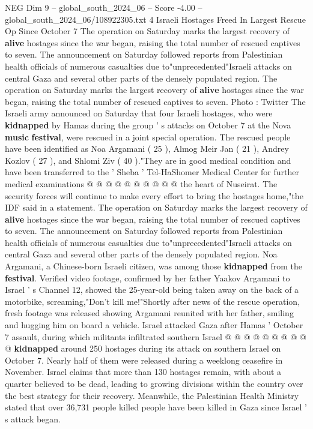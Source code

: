 \begin{textsample}{NEG Dim 9 – global\_south\_2024\_06 – Score -4.00 – global\_south\_2024\_06/108922305.txt}  \label{ex:f9_neg_359}
4 Israeli Hostages Freed In Largest Rescue Op Since October 7 The operation on Saturday marks the largest recovery of \textbf{alive} hostages since the war began, raising the total number of rescued captives to seven.
The announcement on Saturday followed reports from Palestinian health officials of numerous casualties due to"unprecedented"Israeli attacks on central Gaza and several other parts of the densely populated region.
The operation on Saturday marks the largest recovery of \textbf{alive} hostages since the war began, raising the total number of rescued captives to seven.
Photo : Twitter The Israeli army announced on Saturday that four Israeli hostages, who were \textbf{kidnapped} by Hamas during the group ' s attacks on October 7 at the Nova \textbf{music} \textbf{festival}, were rescued in a joint special operation.
The rescued people have been identified as Noa Argamani ( 25 ), Almog Meir Jan ( 21 ), Andrey Kozlov ( 27 ), and Shlomi Ziv ( 40 )."They are in good medical condition and have been transferred to the ' Sheba ' Tel-HaShomer Medical Center for further medical examinations @ @ @ @ @ @ @ @ @ @ the heart of Nuseirat.
The security forces will continue to make every effort to bring the hostages home,"the IDF said in a statement.
The operation on Saturday marks the largest recovery of \textbf{alive} hostages since the war began, raising the total number of rescued captives to seven.
The announcement on Saturday followed reports from Palestinian health officials of numerous casualties due to"unprecedented"Israeli attacks on central Gaza and several other parts of the densely populated region.
Noa Argamani, a Chinese-born Israeli citizen, was among those \textbf{kidnapped} from the \textbf{festival}.
Verified video footage, confirmed by her father Yaakov Argamani to Israel ' s Channel 12, showed the 25-year-old being taken away on the back of a motorbike, screaming,"Don't kill me!"Shortly after news of the rescue operation, fresh footage was released showing Argamani reunited with her father, smiling and hugging him on board a vehicle.
Israel attacked Gaza after Hamas ' October 7 assault, during which militants infiltrated southern Israel @ @ @ @ @ @ @ @ @ @ \textbf{kidnapped} around 250 hostages during its attack on southern Israel on October 7.
Nearly half of them were released during a weeklong ceasefire in November.
Israel claims that more than 130 hostages remain, with about a quarter believed to be dead, leading to growing divisions within the country over the best strategy for their recovery.
Meanwhile, the Palestinian Health Ministry stated that over 36,731 people killed people have been killed in Gaza since Israel ' s attack began.

\end{textsample}

